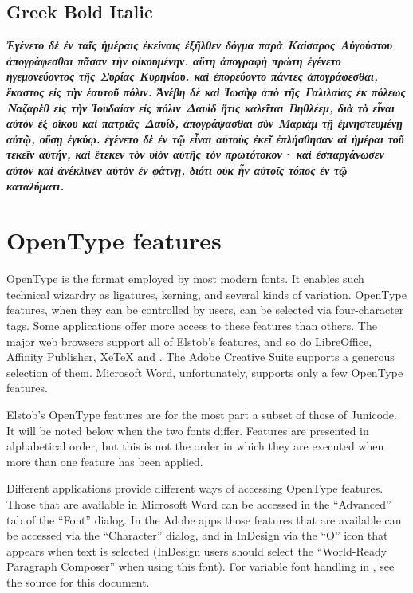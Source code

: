 \documentclass[12pt,letterpaper,openany]{book}
\begin{document}
\section{Greek {Bold Italic}}

\textit{\textbf{\large Ἐγένετο δὲ ἐν ταῖς ἡμέραις ἐκείναις ἐξῆλθεν δόγμα παρὰ Καίσαρος 
Αὐγούστου ἀπογράφεσθαι πᾶσαν τὴν οἰκουμένην. αὕτη ἀπογραφὴ πρώτη 
ἐγένετο ἡγεμονεύοντος τῆς Συρίας Κυρηνίου. καὶ ἐπορεύοντο πάντες 
ἀπογράφεσθαι, ἕκαστος εἰς τὴν ἑαυτοῦ πόλιν. Ἀνέβη δὲ καὶ Ἰωσὴφ ἀπὸ 
τῆς Γαλιλαίας ἐκ πόλεως Ναζαρὲθ εἰς τὴν Ἰουδαίαν εἰς πόλιν Δαυὶδ 
ἥτις καλεῖται Βηθλέεμ, διὰ τὸ εἶναι αὐτὸν ἐξ οἴκου καὶ πατριᾶς Δαυίδ,
ἀπογράψασθαι σὺν Μαριὰμ τῇ ἐμνηστευμένῃ αὐτῷ, οὔσῃ ἐγκύῳ. ἐγένετο δὲ 
ἐν τῷ εἶναι αὐτοὺς ἐκεῖ ἐπλήσθησαν αἱ ἡμέραι τοῦ τεκεῖν αὐτήν, καὶ 
ἔτεκεν τὸν υἱὸν αὐτῆς τὸν πρωτότοκον· καὶ ἐσπαργάνωσεν αὐτὸν καὶ 
ἀνέκλινεν αὐτὸν ἐν φάτνῃ, διότι οὐκ ἦν αὐτοῖς τόπος ἐν τῷ καταλύματι.}}



\chapter{OpenType features}

OpenType is the format employed by most modern fonts. It enables such technical
wizardry as ligatures, kerning, and several kinds of variation. OpenType features,
when they can be controlled by users, can be selected via four-character tags.
Some applications offer more access to these features than others. The major web browsers
support all of Elstob’s features, and so do LibreOffice, Affinity Publisher,
XeTeX and {\ltech}. The Adobe Creative Suite supports a generous selection of
them. Microsoft Word, unfortunately, supports only a few OpenType features.

Elstob’s OpenType
features are for the most part a subset of those of Junicode. It will be noted
below when the two fonts differ. Features are presented in alphabetical order,
but this is not the order in which they are executed when more than one feature
has been applied.

Different applications provide different ways of accessing OpenType features.
Those that are available in Microsoft Word can be accessed in the “Advanced”
tab of the “Font” dialog. In the Adobe apps those features that are available
can be accessed via the “Character” dialog, and in InDesign via the “O” icon that
appears when text is selected (InDesign users should select the “World-Ready
Paragraph Composer” when using this font). For variable font handling in
{\ltech}, see the source for this document.
\end{document}
